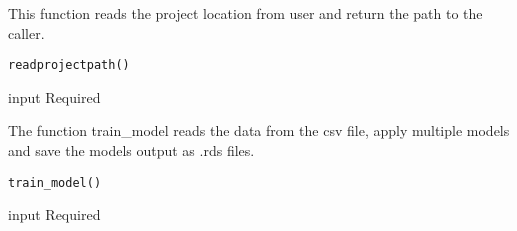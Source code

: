 \documentclass[a4paper]{book}
\begin{document}
%
\begin{Description}\relax
This function reads the project location from user and return the path to the caller.
\end{Description}
%
\begin{Usage}
\begin{verbatim}
readprojectpath()
\end{verbatim}
\end{Usage}
%
\begin{Arguments}
\begin{ldescription}
\item[\code{No}] input Required
\end{ldescription}
\end{Arguments}
%
\begin{Description}\relax
The function train\_model reads the data from the csv file, apply multiple models and save the models output as .rds files.
\end{Description}
%
\begin{Usage}
\begin{verbatim}
train_model()
\end{verbatim}
\end{Usage}
%
\begin{Arguments}
\begin{ldescription}
\item[\code{No}] input Required
\end{ldescription}
\end{Arguments}
\printindex{}
\end{document}
